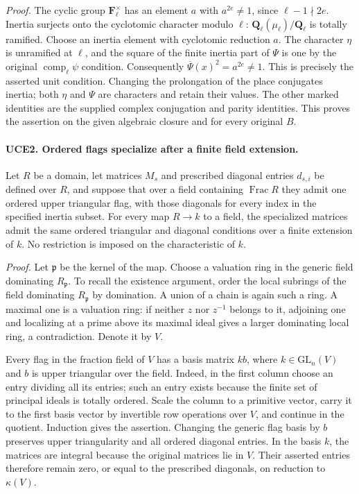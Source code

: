 \documentclass[11pt,a4paper]{article}
\numberwithin{equation}{section}
\theoremstyle{remark}\newtheorem{remark}[theorem]{Remark}
\begin{document}
\emph{Proof.}
The cyclic group \(\mathbf F_\ell^\times\) has an element \(a\)
with \(a^{2e}\ne1\), since \(\ell-1\nmid2e\).
Inertia surjects onto the cyclotomic character modulo \(\ell\):
\(\mathbf Q_\ell(\mu_\ell)/\mathbf Q_\ell\) is totally ramified.
Choose an inertia element with cyclotomic reduction \(a\).
The character \(\eta\) is unramified at \(\ell\), and the square
of the finite inertia part of \(\Psi\) is one by the original
\(\operatorname{comp}_\ell\psi\) condition.  Consequently
\(\overline\Psi(x)^2=a^{2e}\ne1\).  This is precisely the asserted
unit condition.  Changing the prolongation of the place conjugates
inertia; both \(\eta\) and \(\Psi\) are characters and retain their
values.  The other marked identities are the supplied complex
conjugation and parity identities.  This proves the assertion on the
given algebraic closure and for every original \(B\).

\paragraph{UCE2. Ordered flags specialize after a finite field extension.}
\label{claim:UCE2}
Let \(R\) be a domain, let matrices \(M_s\) and prescribed diagonal
entries \(d_{s,i}\) be defined over \(R\), and suppose that over a
field containing \(\operatorname{Frac}R\) they admit one ordered
upper triangular flag, with those diagonals for every index in the
specified inertia subset.  For every map \(R\to k\) to a field,
the specialized matrices admit the same ordered triangular and
diagonal conditions over a finite extension of \(k\).
No restriction is imposed on the characteristic of \(k\).

\emph{Proof.}
Let \(\mathfrak p\) be the kernel of the map.  Choose a valuation
ring in the generic field dominating \(R_{\mathfrak p}\).
To recall the existence argument, order the local subrings of the
field dominating \(R_{\mathfrak p}\) by domination.  A union of a
chain is again such a ring.  A maximal one is a valuation ring:
if neither \(z\) nor \(z^{-1}\) belongs to it, adjoining one and
localizing at a prime above its maximal ideal gives a larger
dominating local ring, a contradiction.  Denote it by \(V\).

Every flag in the fraction field of \(V\) has a basis matrix
\(k b\), where \(k\in\mathrm{GL}_n(V)\) and \(b\) is upper
triangular over the field.  Indeed, in the first column choose an
entry dividing all its entries; such an entry exists because the
finite set of principal ideals is totally ordered.  Scale the
column to a primitive vector, carry it to the first basis vector by
invertible row operations over \(V\), and continue in the quotient.
Induction gives the assertion.  Changing the generic flag basis by
\(b\) preserves upper triangularity and all ordered diagonal entries.
In the basis \(k\), the matrices are integral because the original
matrices lie in \(V\).  Their asserted entries therefore remain zero,
or equal to the prescribed diagonals, on reduction to \(\kappa(V)\).
\end{document}
